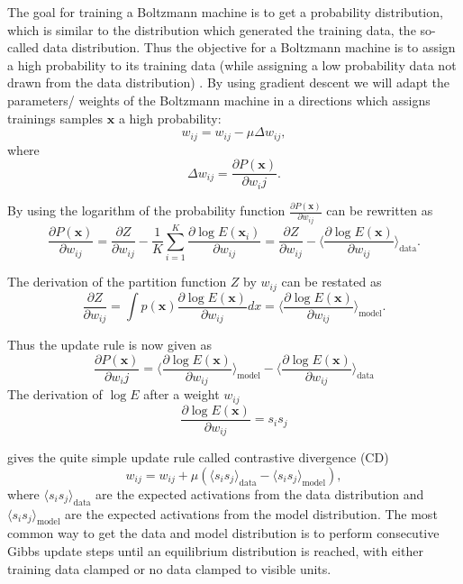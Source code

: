 The goal for training a Boltzmann machine is to get a probability distribution, which is similar to the distribution which generated the training data, the so-called data distribution.
Thus the objective for a Boltzmann machine is to assign a high probability to its training data (while assigning a low probability data not drawn from the data distribution) \cite{ackley1985learning} \cite{hinton2002training} \cite{Woodford2002} \cite{Bengio2009}.
By using gradient descent we will adapt the parameters/ weights of the Boltzmann machine in a directions which assigns trainings samples $\textbf{x}$ a high probability:
\[
w_{ij} = w_{ij} - \mu \Delta w_{ij},
\]
where
\[
\Delta w_{ij} = \frac{\partial P(\textbf{x})}{\partial w_ij}.
\]

By using the logarithm of the probability function $\frac{\partial P(\textbf{x})}{\partial w_{ij}}$ can be rewritten as
\[
\frac{\partial P(\textbf{x})}{\partial w_{ij}} = \frac{\partial Z}{\partial w_{ij}} - \frac{1}{K} \sum_{i=1}^K \frac{\partial \log E(\textbf{x}_i)}{\partial w_{ij}} =  \frac{\partial Z}{\partial w_{ij}} - \Big \langle \frac{\partial \log E(\textbf{x})}{\partial w_{ij}} \Big \rangle_{\text{data}}.
\]    

The derivation of the partition function $Z$ by $w_{ij}$ can be restated as
\[
 \frac{\partial Z}{\partial w_{ij}} = \int p(\textbf{x}) \frac{\partial \log E(\textbf{x})}{\partial w_{ij}} dx = \Big \langle \frac{\partial \log E(\textbf{x})}{\partial w_{ij}} \Big \rangle_{\text{model}}.
\]

Thus the update rule is now given as
\[
\frac{\partial P(\textbf{x})}{\partial w_ij} =  \Big \langle \frac{\partial \log E(\textbf{x})}{\partial w_{ij}} \Big \rangle_{\text{model}} - \Big \langle \frac{\partial \log E(\textbf{x})}{\partial w_{ij}} \Big \rangle_{\text{data}}
\]
The derivation of $\log E$ after a weight $w_{ij}$
\[
\frac{\partial \log E(\textbf{x})}{\partial w_{ij}} = s_i s_j
\]

gives the quite simple update rule called contrastive divergence (CD)
\[
w_{ij}= w_{ij} + \mu ( \langle s_i s_j \rangle_{\text{data}} - \langle s_i s_j \rangle_{\text{model}} ) ,
\]
where $\langle s_i s_j \rangle_{\text{data}}$ are the expected activations from the data distribution and  $ \langle s_i s_j \rangle_{\text{model}}$ are the expected activations from the model distribution.
The most common way to get the data and model distribution is to perform consecutive Gibbs update steps until an equilibrium distribution is reached, with either training data clamped or no data clamped to visible units.

